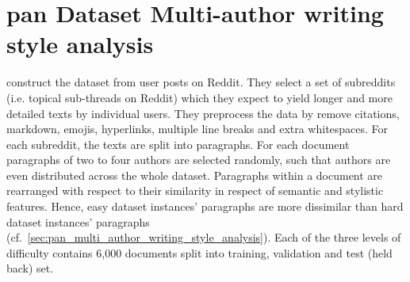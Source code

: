 \section{\acs{pan} Dataset Multi-author writing style analysis}
\label{sec:pan_dataset_multi_author_writing_style_analysis}

\citet{zangerle_overview_2024} construct the dataset from user posts on Reddit.
They select a set of subreddits (i.e. topical sub-threads on Reddit) 
which they expect to yield longer and more detailed texts by individual users.
They preprocess the data by remove citations, markdown, emojis, hyperlinks, 
multiple line breaks and extra whitespaces.
For each subreddit, the texts are split into paragraphs.
For each document paragraphs of two to four authors are selected randomly, 
such that authors are even distributed across the whole dataset.
Paragraphs within a document are rearranged with respect to their similarity 
in respect of semantic and stylistic features.
Hence, easy dataset instances' paragraphs are more dissimilar 
than hard dataset instances' paragraphs (cf.~\autoref{sec:pan_multi_author_writing_style_analysis}).
Each of the three levels of difficulty contains 6,000 documents 
split into training, validation and test (held back) set.